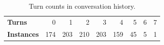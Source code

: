 \begin{table}[t]
    \footnotesize
    \centering
    \setlength{\tabcolsep}{5pt}
    \begin{tabular}{l|rrrrrrrr}
        \toprule
        \textbf{Turns} & 0 & 1 & 2 & 3 & 4 & 5 & 6 & 7 \\
        \textbf{Instances} & 174 & 203 & 210 & 203 & 159 & 45 & 5 & 1 \\
        \bottomrule
    \end{tabular}
    \caption{Turn counts in conversation history.}
    \label{tab:turn-distribution}
\end{table}

